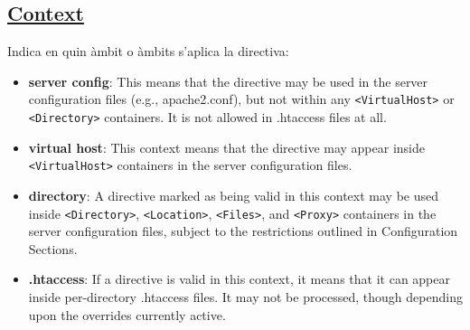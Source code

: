 \documentclass[a4paper, 11pt]{article}
\begin{document}
\subsection{\href{http://localhost/apache2-doc/es/mod/directive-dict.html#Context}{Context}} Indica en quin àmbit o àmbits s'aplica la directiva:
\begin{itemize}
	\item \textbf{server config}: This means that the directive may be used in the server configuration files (e.g., apache2.conf), but not within any \verb+<VirtualHost>+ or \verb+<Directory>+ containers. It is not allowed in .htaccess files at all. 
	\item \textbf{virtual host}: This context means that the directive may appear inside \verb+<VirtualHost>+ containers in the server configuration files. 
	\item \textbf{directory}: A directive marked as being valid in this context may be used inside \verb+<Directory>+, \verb+<Location>+, \verb+<Files>+, and \verb+<Proxy>+ containers in the server configuration files, subject to the restrictions outlined in Configuration Sections. 
	\item \textbf{.htaccess}: If a directive is valid in this context, it means that it can appear inside per-directory .htaccess files. It may not be processed, though depending upon the overrides currently active. 
\end{itemize}
\end{document}
